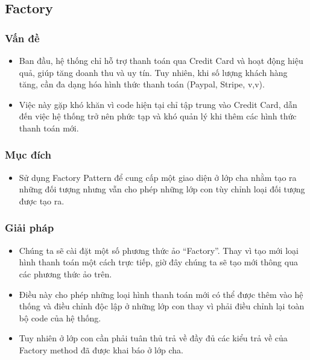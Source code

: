\thispagestyle{empty}
\subsection{Factory}
\subsubsection{Vấn đề}
\begin{flushleft}
    \begin{itemize}
        \item Ban đầu, hệ thống chỉ hỗ trợ thanh toán qua Credit Card và hoạt động hiệu quả, giúp tăng doanh thu và uy tín. Tuy nhiên, khi số lượng khách hàng tăng, cần đa dạng hóa hình thức thanh toán (Paypal, Stripe, v,v).

        \item Việc này gặp khó khăn vì code hiện tại chỉ tập trung vào Credit Card, dẫn đến việc hệ thống trở nên phức tạp và khó quản lý khi thêm các hình thức thanh toán mới.
    \end{itemize}
\end{flushleft}

\subsubsection{Mục đích}
\begin{flushleft}
    \begin{itemize}
        \item Sử dụng Factory Pattern để cung cấp một giao diện ở lớp cha nhằm tạo ra những đối tượng nhưng vẫn cho phép những lớp con tùy chỉnh loại đối tượng được tạo ra.
    \end{itemize}
\end{flushleft}

\subsubsection{Giải pháp}
\begin{flushleft}
    \begin{itemize}
        \item Chúng ta sẽ cài đặt một số phương thức ảo “Factory”. Thay vì tạo mới loại hình thanh toán một cách trực tiếp, giờ đây chúng ta sẽ tạo mới thông qua các phương thức ảo trên.
        \item Điều này cho phép những loại hình thanh toán mới có thể được thêm vào hệ thống và điều chỉnh độc lập ở những lớp con thay vì phải điều chỉnh lại toàn bộ code của hệ thống.
        \item Tuy nhiên ở lớp con cần phải tuân thủ trả về đầy đủ các kiểu trả về của Factory method đã được khai báo ở lớp cha.
    \end{itemize}
\end{flushleft}

